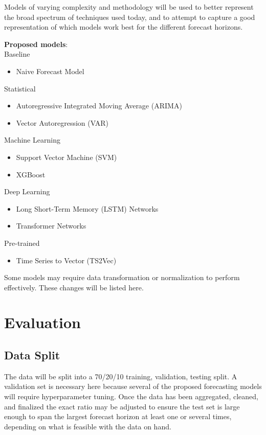 \documentclass[sigconf]{acmart}
\begin{document}
Models of varying complexity and methodology will be used to better represent the broad spectrum of techniques used today, and to attempt to capture a good representation of which models work best for the different forecast horizons. 

\textbf{Proposed models}:
\\
Baseline
\begin{itemize}
    \item{Naive Forecast Model}
\end{itemize}
Statistical
\begin{itemize}
    \item{Autoregressive Integrated Moving Average (ARIMA)}
    \item{Vector Autoregression (VAR)}
\end{itemize}
Machine Learning
\begin{itemize}
    \item{Support Vector Machine (SVM)}
    \item{XGBoost}
\end{itemize}
Deep Learning
\begin{itemize}
    \item{Long Short-Term Memory (LSTM) Networks}
    \item{Transformer Networks}
\end{itemize}
Pre-trained
\begin{itemize}
    \item{Time Series to Vector (TS2Vec)}
\end{itemize}

Some models may require data transformation or normalization to perform effectively. These changes will be listed here.

\section{Evaluation}

\subsection{Data Split}
The data will be split into a 70/20/10 training, validation, testing split. A validation set is necessary here because several of the proposed forecasting models will require hyperparameter tuning. Once the data has been aggregated, cleaned, and finalized the exact ratio may be adjusted to ensure the test set is large enough to span the largest forecast horizon at least one or several times, depending on what is feasible with the data on hand.
\end{document}
